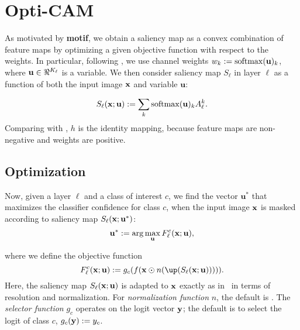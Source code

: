 \section{Opti-CAM}
As motivated by \textbf{motif}, we obtain a saliency map as a convex combination of feature maps
 by optimizing a given objective function with respect to the weights.
In particular, following \autocite{wang2020score}, we use channel weights $w_k \mathrel{:=} \operatorname{softmax}(
	\mathbf{u})_k$, where $\mathbf{u} \in \real^{K_\ell}$ is a variable.
We then consider saliency map $S_\ell$ in layer $\ell$ as a function of both the input image $\mathbf{x}$ 
and variable $\mathbf{u}$:

\begin{equation}
    S_\ell(\mathbf{x}; \mathbf{u}) \mathrel{:=} \sum_k \operatorname{softmax}(\mathbf{u})_k A^k_\ell.
\label{eq:v-sal}
\end{equation}
Comparing with , $h$ is the identity mapping, because feature maps are non-negative and
 weights are positive.


\subsection{Optimization}
Now, given a layer $\ell$ and a class of interest $c$, we find the vector $\mathbf{u}^*$ that
 maximizes the classifier confidence for class $c$, when the input image $\mathbf{x}$ is masked according 
 to saliency map $S_\ell(\mathbf{x}; \mathbf{u}^*)$:
\begin{equation}
	\mathbf{u}^* \mathrel{:=} \arg\max_{\mathbf{u}} F^c_\ell(\mathbf{x}; \mathbf{u}),
\label{eq:opt}
\end{equation}

where we define the objective function
\begin{equation}
	F^c_\ell(\vx; \mathbf{u}) \defn g_c(f(\vx \odot n(\up(S_\ell(\vx; \mathbf{u}))))).
\label{eq:obj}
\end{equation}
Here, the saliency map $S_\ell(\mathbf{x}; \mathbf{u})$ is adapted to $\mathbf{x}$ exactly as in~ in 
terms of resolution and normalization. For \emph{normalization function} $n$, the default is
 . 
The \emph{selector function} $g_c$ operates on the logit vector $\mathbf{y}$; the default is to select the
 logit of class $c$, \ie $g_c(\mathbf{y}) \mathrel{:=} y_c$. %


